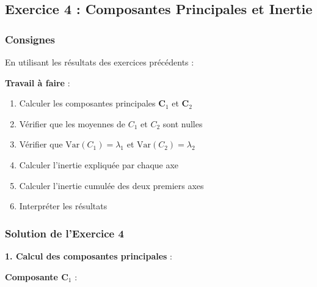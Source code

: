 \documentclass[11pt,a4paper]{article}
\newcommand{\Var}{\text{Var}}
\begin{document}
\newpage

\subsection{Exercice 4 : Composantes Principales et Inertie}

\subsubsection{Consignes}

En utilisant les résultats des exercices précédents :

\textbf{Travail à faire} :
\begin{enumerate}
    \item Calculer les composantes principales $\mathbf{C}_1$ et $\mathbf{C}_2$
    \item Vérifier que les moyennes de $C_1$ et $C_2$ sont nulles
    \item Vérifier que $\Var(C_1) = \lambda_1$ et $\Var(C_2) = \lambda_2$
    \item Calculer l'inertie expliquée par chaque axe
    \item Calculer l'inertie cumulée des deux premiers axes
    \item Interpréter les résultats
\end{enumerate}

\subsubsection{Solution de l'Exercice 4}

\textbf{1. Calcul des composantes principales} :

\textbf{Composante $\mathbf{C}_1$} :
\end{document}
